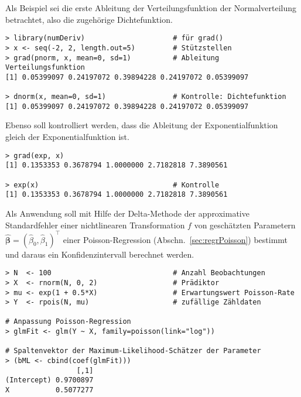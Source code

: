 Als Beispiel sei die erste Ableitung der Verteilungsfunktion der Normalverteilung betrachtet, also die zugehörige Dichtefunktion.
\begin{lstlisting}
> library(numDeriv)                     # für grad()
> x <- seq(-2, 2, length.out=5)         # Stützstellen
> grad(pnorm, x, mean=0, sd=1)          # Ableitung Verteilungsfunktion
[1] 0.05399097 0.24197072 0.39894228 0.24197072 0.05399097

> dnorm(x, mean=0, sd=1)                # Kontrolle: Dichtefunktion
[1] 0.05399097 0.24197072 0.39894228 0.24197072 0.05399097
\end{lstlisting}

Ebenso soll kontrolliert werden, dass die Ableitung der Exponentialfunktion gleich der Exponentialfunktion ist.
\begin{lstlisting}
> grad(exp, x)
[1] 0.1353353 0.3678794 1.0000000 2.7182818 7.3890561

> exp(x)                                # Kontrolle
[1] 0.1353353 0.3678794 1.0000000 2.7182818 7.3890561
\end{lstlisting}

Als Anwendung soll mit Hilfe der Delta-Methode der approximative Standardfehler einer nichtlinearen Transformation $f$ von geschätzten Parametern $\hat{\bm{\beta}} = (\hat{\beta}_{0}, \hat{\beta}_{1})^{\top}$ einer Poisson-Regression (Abschn.\ \ref{sec:regrPoisson}) bestimmt und daraus ein Konfidenzintervall berechnet werden.
\begin{lstlisting}
> N  <- 100                             # Anzahl Beobachtungen
> X  <- rnorm(N, 0, 2)                  # Prädiktor
> mu <- exp(1 + 0.5*X)                  # Erwartungswert Poisson-Rate
> Y  <- rpois(N, mu)                    # zufällige Zähldaten

# Anpassung Poisson-Regression
> glmFit <- glm(Y ~ X, family=poisson(link="log"))

# Spaltenvektor der Maximum-Likelihood-Schätzer der Parameter
> (bML <- cbind(coef(glmFit)))
                 [,1]
(Intercept) 0.9700897
X           0.5077277
\end{lstlisting}

